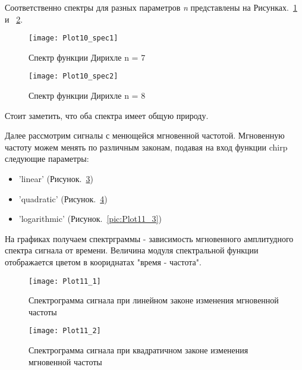 Соответственно спектры для разных параметров \textit{n} представлены на Рисунках.~\ref{pic:Plot10_spec1} и ~\ref{pic:Plot10_spec2}.

\begin{figure}[H]
	\begin{center}
		\texttt{[image: Plot10\_spec1]}
		\caption{Спектр функции Дирихле n = 7} 
		\label{pic:Plot10_spec1} %
	\end{center}
\end{figure}

\begin{figure}[H]
	\begin{center}
		\texttt{[image: Plot10\_spec2]}
		\caption{Спектр функции Дирихле n = 8} 
		\label{pic:Plot10_spec2} %
	\end{center}
\end{figure}
Стоит заметить, что оба спектра имеет общую природу.

Далее рассмотрим сигналы с менющейся мгновенной частотой. Мгновенную частоту можем менять по различным законам, подавая на вход функции chirp следующие параметры:
\begin{itemize}
\item 'linear'  (Рисунок.~\ref{pic:Plot11_1})
\item 'quadratic' (Рисунок.~\ref{pic:Plot11_2})
\item 'logarithmic' (Рисунок.~\ref{pic:Plot11_3})
\end{itemize}


\parindent=1cm %
 На графиках получаем спектрграммы - зависимость мгновенного амплитудного спектра сигнала от времени. Величина модуля спектральной функции отображается цветом в коориднатах "время - частота".

\begin{figure}[H]
	\begin{center}
		\texttt{[image: Plot11\_1]}
		\caption{Спектрограмма сигнала при линейном законе изменения мгновенной частоты} 
		\label{pic:Plot11_1} %
	\end{center}
\end{figure}

\begin{figure}[H]
	\begin{center}
		\texttt{[image: Plot11\_2]}
		\caption{Спектрограмма сигнала при квадратичном законе изменения мгновенной частоты} 
		\label{pic:Plot11_2} %
	\end{center}
\end{figure}

